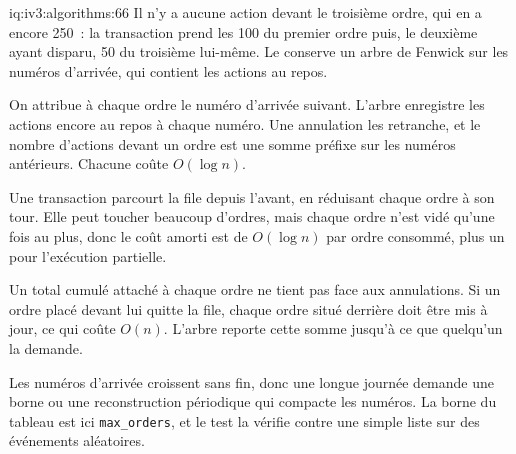 \begin{solution}{iq:iv3:algorithms:66}
Il n'y a aucune action devant le troisième ordre, qui en a encore 250~: la transaction prend les 100 du premier ordre puis, le deuxième ayant disparu, 50 du troisième lui-même. Le  conserve un arbre de Fenwick sur les numéros d'arrivée, qui contient les actions au repos.
\label{lst:iv3:al:queuepos}

On attribue à chaque ordre le numéro d'arrivée suivant. L'arbre enregistre les actions encore au repos à chaque numéro. Une annulation les retranche, et le nombre d'actions devant un ordre est une somme préfixe sur les numéros antérieurs. Chacune coûte $O(\log n)$.

Une transaction parcourt la file depuis l'avant, en réduisant chaque ordre à son tour. Elle peut toucher beaucoup d'ordres, mais chaque ordre n'est vidé qu'une fois au plus, donc le coût amorti est de $O(\log n)$ par ordre consommé, plus un pour l'exécution partielle.

Un total cumulé attaché à chaque ordre ne tient pas face aux annulations. Si un ordre placé devant lui quitte la file, chaque ordre situé derrière doit être mis à jour, ce qui coûte $O(n)$. L'arbre reporte cette somme jusqu'à ce que quelqu'un la demande.

Les numéros d'arrivée croissent sans fin, donc une longue journée demande une borne ou une reconstruction périodique qui compacte les numéros. La borne du tableau est ici \texttt{max\_orders}, et le test la vérifie contre une simple liste sur des événements aléatoires.

\end{solution}

